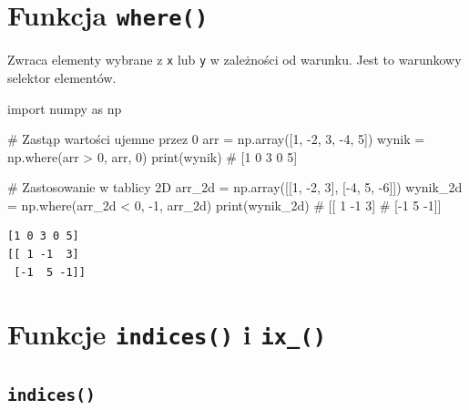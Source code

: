 \documentclass[
  letterpaper,
  DIV=11,
  numbers=noendperiod]{scrreprt}
\newenvironment{Shaded}{\begin{snugshade}}{\end{snugshade}}
\newcommand{\BuiltInTok}[1]{\textcolor[rgb]{0.00,0.23,0.31}{#1}}
\newcommand{\CommentTok}[1]{\textcolor[rgb]{0.37,0.37,0.37}{#1}}
\newcommand{\DecValTok}[1]{\textcolor[rgb]{0.68,0.00,0.00}{#1}}
\newcommand{\ImportTok}[1]{\textcolor[rgb]{0.00,0.46,0.62}{#1}}
\newcommand{\NormalTok}[1]{\textcolor[rgb]{0.00,0.23,0.31}{#1}}
\newcommand{\OperatorTok}[1]{\textcolor[rgb]{0.37,0.37,0.37}{#1}}
\begin{document}
\section{\texorpdfstring{Funkcja
\texttt{where()}}{Funkcja where()}}\label{funkcja-where}

Zwraca elementy wybrane z \texttt{x} lub \texttt{y} w zależności od
warunku. Jest to warunkowy selektor elementów.

\begin{Shaded}
\begin{Highlighting}[]
\ImportTok{import}\NormalTok{ numpy }\ImportTok{as}\NormalTok{ np}

\CommentTok{\# Zastąp wartości ujemne przez 0}
\NormalTok{arr }\OperatorTok{=}\NormalTok{ np.array([}\DecValTok{1}\NormalTok{, }\OperatorTok{{-}}\DecValTok{2}\NormalTok{, }\DecValTok{3}\NormalTok{, }\OperatorTok{{-}}\DecValTok{4}\NormalTok{, }\DecValTok{5}\NormalTok{])}
\NormalTok{wynik }\OperatorTok{=}\NormalTok{ np.where(arr }\OperatorTok{\textgreater{}} \DecValTok{0}\NormalTok{, arr, }\DecValTok{0}\NormalTok{)}
\BuiltInTok{print}\NormalTok{(wynik)  }\CommentTok{\# [1 0 3 0 5]}

\CommentTok{\# Zastosowanie w tablicy 2D}
\NormalTok{arr\_2d }\OperatorTok{=}\NormalTok{ np.array([[}\DecValTok{1}\NormalTok{, }\OperatorTok{{-}}\DecValTok{2}\NormalTok{, }\DecValTok{3}\NormalTok{], [}\OperatorTok{{-}}\DecValTok{4}\NormalTok{, }\DecValTok{5}\NormalTok{, }\OperatorTok{{-}}\DecValTok{6}\NormalTok{]])}
\NormalTok{wynik\_2d }\OperatorTok{=}\NormalTok{ np.where(arr\_2d }\OperatorTok{\textless{}} \DecValTok{0}\NormalTok{, }\OperatorTok{{-}}\DecValTok{1}\NormalTok{, arr\_2d)}
\BuiltInTok{print}\NormalTok{(wynik\_2d)}
\CommentTok{\# [[ 1 {-}1  3]}
\CommentTok{\#  [{-}1  5 {-}1]]}
\end{Highlighting}
\end{Shaded}

\begin{verbatim}
[1 0 3 0 5]
[[ 1 -1  3]
 [-1  5 -1]]
\end{verbatim}

\section{\texorpdfstring{Funkcje \texttt{indices()} i
\texttt{ix\_()}}{Funkcje indices() i ix\_()}}\label{funkcje-indices-i-ix_}

\subsection{\texorpdfstring{\texttt{indices()}}{indices()}}\label{indices}
\end{document}
